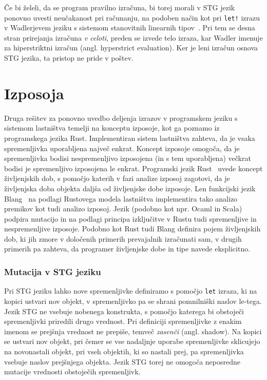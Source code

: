 Če bi želeli, da se program pravilno izračuna, bi torej morali v STG jezik ponovno uvesti neučakanost pri računanju, na podoben način kot pri \texttt{let!} izrazu v Wadlerjevem jeziku s sistemom stanovitnih linearnih tipov~\cite{wadler1990linear}. Pri tem se desna stran prirejanja izračuna \emph{v celoti}, preden se izvede telo izraza, kar Wadler imenuje za hiperstriktni izračun (angl. hyperstrict evaluation). Ker je leni izračun osnova STG jezika, ta pristop ne pride v poštev.

\section{Izposoja}


Druga rešitev za ponovno uvedbo deljenja izrazov v programskem jeziku s sistemom lastništva temelji na konceptu izposoje, kot ga poznamo iz programskega jezika Rust. Implementiran sistem lastništva zahteva, da je vsaka spremenljivka uporabljena največ enkrat. Koncept izposoje omogoča, da je spremenljivka bodisi nespremenljivo izposojena (in s tem uporabljena) večkrat bodisi je spremenljivo izposojena le enkrat. Programski jezik Rust~\cite{klabnik2023rust} uvede koncept življenjskih dob, s pomočjo katerih v fazi analize izposoj zagotovi, da je življenjska doba objekta daljša od življenjske dobe izposoje. Len funkcijski jezik Blang~\cite{turk2022len} na podlagi Rustovega modela lastništva implementira tako analizo premikov kot tudi analizo izposoj. Jezik (podobno kot npr. Ocaml in Scala) podpira mutacijo in na podlagi principa izključitve v Rustu tudi spremenljive in nespremenljive izposoje. Podobno kot Rust tudi Blang definira pojem življenjskih dob, ki jih zmore v določenih primerih prevajalnik izračunati sam, v drugih primerih pa zahteva, da programer življenjske dobe in tipe navede eksplicitno.

\subsubsection{Mutacija v STG jeziku}
Pri STG jeziku lahko nove spremenljivke definiramo s pomočjo \texttt{let} izraza, ki na kopici ustvari nov objekt, v spremenljivko pa se shrani pomnilniški naslov le-tega. Jezik STG ne vsebuje nobenega konstrukta, s pomočjo katerega bi obstoječi spremenljivki priredili drugo vrednost. Pri definiciji spremenljivke z enakim imenom se prejšnja vrednost ne prepiše, temveč \emph{zasenči} (angl. shadow). Na kopici se ustvari nov objekt, pri čemer se vse nadaljnje uporabe spremenljivke sklicujejo na novonastali objekt, pri vseh objektih, ki so nastali prej, pa spremenljivka vsebuje naslov prejšnjega objekta. Jezik STG torej ne omogoča neposredne mutacije vrednosti obstoječih spremenljivk.

